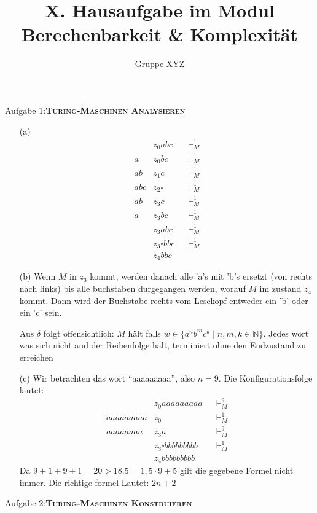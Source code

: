 \documentclass[a4paper,onecolumn,oneside,12pt,ngerman]{article}
\date{}
\title{X. Hausaufgabe im Modul \\ \glqq Berechenbarkeit \& Komplexität\grqq} %
\author{Gruppe XYZ} %
\theoremstyle{plain} %
\theoremstyle{definition} %
\theoremstyle{remark} %
\theoremstyle{plain}
\newcommand{\NN}{\mathbb{N}} %
\newcommand{\tstep}[1][1]{\vdash^#1_M} %
\begin{document}

\maketitle
\newpage
Aufgabe 1:\quad\textsc{\textbf{Turing-Maschinen Analysieren}}
\begin{enumerate}
    \item[(a)]
    \begin{align*}
    &z_0abc  &&\tstep  \\
    a&z_0bc   &&\tstep  \\
    ab&z_1c    &&\tstep  \\
    abc&z_2\square     &&\tstep  \\
    ab&z_3c    &&\tstep  \\
    a&z_3bc   &&\tstep  \\
    &z_3abc  &&\tstep  \\
    &z_3\square bbc  &&\tstep \\
    &z_4bbc
    \end{align*}
    
    \item[(b)] 
    Wenn $M$ in $z_3$ kommt, werden danach alle 'a's mit 'b's ersetzt (von rechts nach links) bis alle buchstaben durgegangen werden, worauf $M$ im zustand $z_4$ kommt. Dann wird der Buchstabe rechts vom Lesekopf entweder ein 'b' oder ein 'c' sein.

    Aus $\delta$ folgt offensichtlich: $M$ hält falls $w\in \{a^nb^mc^k\mid n,m,k \in \NN\}$. Jedes wort was sich nicht and der Reihenfolge hält, terminiert ohne den Endzustand zu erreichen
    \item[(c)] 
    Wir betrachten das wort \enquote{aaaaaaaaa}, also $n=9$. Die Konfigurationsfolge lautet:
    \begin{align*}
    &z_0aaaaaaaaa          &&\tstep[9]  \\
    aaaaaaaaa&z_0         &&\tstep  \\
    aaaaaaaa&z_3a         &&\tstep[9]  \\
    &z_3\square bbbbbbbbb  &&\tstep  \\
    &z_4bbbbbbbbb
\end{align*}
    Da $9+1+9+1 = 20 > 18.5 = 1,5\cdot 9 + 5$ gilt die gegebene Formel nicht immer. Die richtige formel Lautet: $2n+2$
\end{enumerate}
\newpage
Aufgabe 2:\quad \textsc{\textbf{Turing-Maschinen Konstruieren}}
\end{document}
